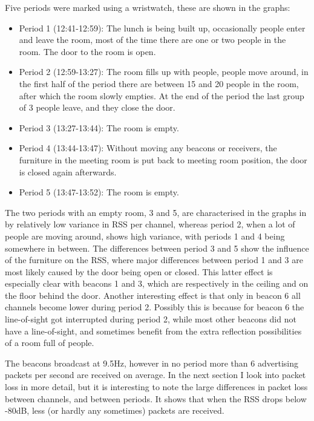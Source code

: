Five periods were marked using a wristwatch, these are shown in the graphs:
\begin{itemize}
    \item Period 1 (12:41-12:59): The lunch is being built up, occasionally people enter and leave the room, most of the time there are one or two people in the room.
        The door to the room is open.
    \item Period 2 (12:59-13:27): The room fills up with people, people move around, in the first half of the period there are between 15 and 20 people in the room, after which the room slowly empties.
        At the end of the period the last group of 3 people leave, and they close the door.
    \item Period 3 (13:27-13:44): The room is empty.
    \item Period 4 (13:44-13:47): Without moving any beacons or receivers, the furniture in the meeting room is put back to meeting room position, the door is closed again afterwards.
    \item Period 5 (13:47-13:52): The room is empty.
\end{itemize}

The two periods with an empty room, 3 and 5, are characterised in the graphs in  by relatively low variance in RSS per channel, whereas period 2, when a lot of people are moving around, shows high variance, with periods 1 and 4 being somewhere in between.
The differences between period 3 and 5 show the influence of the furniture on the RSS, where major differences between period 1 and 3 are most likely caused by the door being open or closed.
This latter effect is especially clear with beacons 1 and 3, which are respectively in the ceiling and on the floor behind the door.
Another interesting effect is that only in beacon 6 all channels become lower during period 2.
Possibly this is because for beacon 6 the line-of-sight got interrupted during period 2, while most other beacons did not have a line-of-sight, and sometimes benefit from the extra reflection possibilities of a room full of people.

The beacons broadcast at 9.5Hz, however in no period more than 6 advertising packets per second are received on average.
In the next section I look into packet loss in more detail, but it is interesting to note the large differences in packet loss between channels, and between periods.
It shows that when the RSS drops below -80dB, less (or hardly any sometimes) packets are received.

